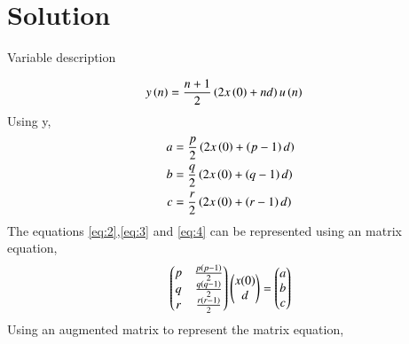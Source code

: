 \documentclass[journal,12pt,twocolumn]{IEEEtran}
\theoremstyle{remark}
\begin{document}
\section*{Solution}
\begin{table}[h]
    \centering
    
    \caption{Variable description}
    \label{tab:11.9.2.11.1}
\end{table}
\begin{align}
    y\left(n\right)&=\dfrac{n+1}{2}\left(2x\left(0\right)+nd\right)u\left(n\right)
\end{align}
Using y,
\begin{align}
    a&=\dfrac{p}{2}\left(2x\left(0\right)+\left(p-1\right)d\right)\label{eq:2}\\
    b&=\dfrac{q}{2}\left(2x\left(0\right)+\left(q-1\right)d\right)\label{eq:3}\\
    c&=\dfrac{r}{2}\left(2x\left(0\right)+\left(r-1\right)d\right)\label{eq:4}
\end{align}
The equations \eqref{eq:2},\eqref{eq:3} and \eqref{eq:4} can be represented using an matrix equation,
\begin{align}
    \begin{pmatrix}p&\frac{p\left(p-1\right)}{2}\\q&\frac{q\left(q-1\right)}{2}\\r&\frac{r\left(r-1\right)}{2}\\\end{pmatrix}
    \begin{pmatrix}x(0)\\d\\\end{pmatrix}
    =
    \begin{pmatrix}a\\b\\c\\\end{pmatrix}\label{eq:5}
\end{align}
Using an augmented matrix to represent the matrix equation,
\end{document}
